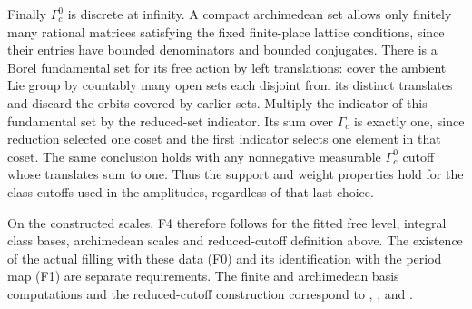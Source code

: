 Finally $\Gamma_c^0$ is discrete at infinity. A compact archimedean
set allows only finitely many rational matrices satisfying the fixed
finite-place lattice conditions, since their entries have bounded
denominators and bounded conjugates. There is a Borel fundamental
set for its free action by left translations: cover the ambient Lie
group by countably many open sets each disjoint from its distinct
translates and discard the orbits covered by earlier sets. Multiply
the indicator of this fundamental set by the reduced-set indicator.
Its sum over $\Gamma_c$ is exactly one, since reduction selected
one coset and the first indicator selects one element in that coset.
The same conclusion holds with any nonnegative measurable
$\Gamma_c^0$ cutoff whose translates sum to one. Thus the support
and weight properties hold for the class cutoffs used in the
amplitudes, regardless of that last choice.

On the constructed scales, F4 therefore follows for the fitted free
level, integral class bases, archimedean scales and reduced-cutoff
definition above. The existence of the actual filling with these
data (F0) and its identification with the period map (F1) are
separate requirements. The finite and archimedean basis computations
and the reduced-cutoff construction correspond to
,
, and
.
